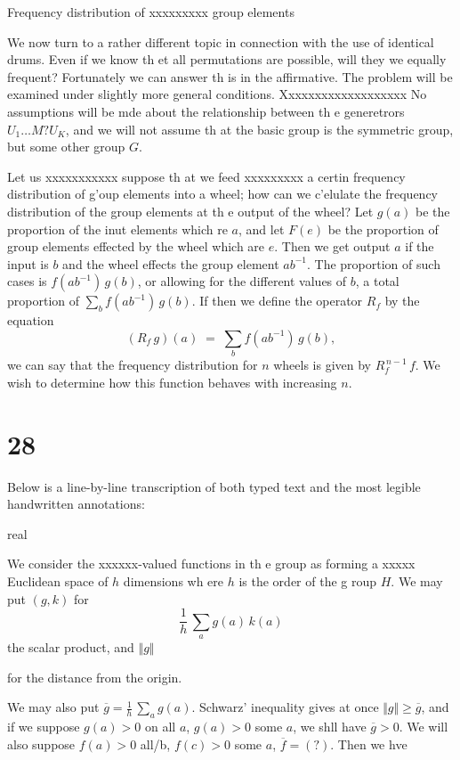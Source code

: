 \documentclass[12pt]{article}
\begin{document}
Frequency distribution of xxxxxxxxx group elements

We now turn to a rather different topic in connection
with the use of identical drums. Even if we know th et all
permutations are possible, will they we equally frequent?
Fortunately we can answer th is in the affirmative. The
problem will be examined under slightly more general conditions.
Xxxxxxxxxxxxxxxxxxx No assumptions will be mde about the
relationship between th e generetrors \(U_1 \ldots M? U_K\), and we will not
assume th at the basic group is the symmetric group, but some
other group \(G\).

Let us xxxxxxxxxxx suppose th at we feed xxxxxxxxx
a certin frequency distribution of g'oup elements into
a wheel; how can we c'elulate the frequency distribution of the
group elements at th e output of the wheel? Let \(g(a)\) be the
proportion of the inut elements which re \(a\), and let \(F(e)\) be
the proportion of group elements effected by the wheel which are \(e\).
Then we get output \(a\) if the input is \(b\) and the wheel effects
the group element \(a b^{-1}\). The proportion of such cases
is \(f(a b^{-1})\, g(b)\), or allowing for the different values of \(b\), a
total proportion of \(\sum_b f(a b^{-1})\, g(b)\). If then we define
the operator \(R_f\) by the equation
\[
(R_f\, g)(a) \;=\; \sum_b f(a b^{-1})\, g(b),
\]
we can say that the frequency distribution for \(n\) wheels is
given by \(R_f^{\,n-1} \,f\). We wish to determine how this function behaves
with increasing \(n\).

\section{28}

Below is a line-by-line transcription of both typed text and the most legible handwritten annotations:

\bigskip

real

We consider the xxxxxx-valued functions in th e group as
forming a xxxxx Euclidean space of \(h\) dimensions wh ere \(h\)
is the order of the g roup \(H\). We may put \((g,k)\) for
\[
\frac{1}{h}\,\sum_a g(a)\,k(a)
\]
the scalar product, and \(\Vert g\Vert\)

for the distance from the origin.

We may also put \(\overline{g} = \frac{1}{h}\,\sum_a g(a)\).
Schwarz' inequality gives at once
\(\Vert g\Vert \ge \overline{g}\), and if
we suppose \(g(a) > 0\) on all \(a\), \(g(a) > 0\) some \(a\), we shll
have \(\overline{g} > 0\). We will also suppose \(f(a) > 0\) all/b, \(f(c) > 0\) some \(a\),
\(\overline{f} = (?)\). Then we hve
\end{document}
